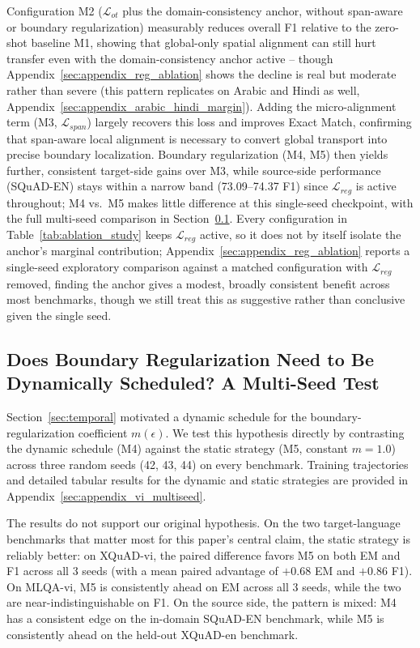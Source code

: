 \documentclass[11pt]{article}
\begin{document}
Configuration M2 ($\mathcal{L}_{ot}$ plus the domain-consistency anchor, without span-aware or boundary regularization) measurably reduces overall F1 relative to the zero-shot baseline M1, showing that global-only spatial alignment can still hurt transfer even with the domain-consistency anchor active -- though Appendix~\ref{sec:appendix_reg_ablation} shows the decline is real but moderate rather than severe (this pattern replicates on Arabic and Hindi as well, Appendix~\ref{sec:appendix_arabic_hindi_margin}). Adding the micro-alignment term (M3, $\mathcal{L}_{span}$) largely recovers this loss and improves Exact Match, confirming that span-aware local alignment is necessary to convert global transport into precise boundary localization. Boundary regularization (M4, M5) then yields further, consistent target-side gains over M3, while source-side performance (SQuAD-EN) stays within a narrow band (73.09--74.37 F1) since $\mathcal{L}_{reg}$ is active throughout; M4 vs.\ M5 makes little difference at this single-seed checkpoint, with the full multi-seed comparison in Section~\ref{sec:margin_impact}. Every configuration in Table~\ref{tab:ablation_study} keeps $\mathcal{L}_{reg}$ active, so it does not by itself isolate the anchor's marginal contribution; Appendix~\ref{sec:appendix_reg_ablation} reports a single-seed exploratory comparison against a matched configuration with $\mathcal{L}_{reg}$ removed, finding the anchor gives a modest, broadly consistent benefit across most benchmarks, though we still treat this as suggestive rather than conclusive given the single seed.

\subsection{Does Boundary Regularization Need to Be Dynamically Scheduled? A Multi-Seed Test}
\label{sec:margin_impact}

Section~\ref{sec:temporal} motivated a dynamic schedule for the boundary-regularization coefficient $m(\epsilon)$. We test this hypothesis directly by contrasting the dynamic schedule (M4) against the static strategy (M5, constant $m=1.0$) across three random seeds (42, 43, 44) on every benchmark. Training trajectories and detailed tabular results for the dynamic and static strategies are provided in Appendix~\ref{sec:appendix_vi_multiseed}.

The results do not support our original hypothesis. On the two target-language benchmarks that matter most for this paper's central claim, the static strategy is reliably better: on XQuAD-vi, the paired difference favors M5 on both EM and F1 across all 3 seeds (with a mean paired advantage of $+0.68$ EM and $+0.86$ F1). On MLQA-vi, M5 is consistently ahead on EM across all 3 seeds, while the two are near-indistinguishable on F1. On the source side, the pattern is mixed: M4 has a consistent edge on the in-domain SQuAD-EN benchmark, while M5 is consistently ahead on the held-out XQuAD-en benchmark. 
\end{document}
